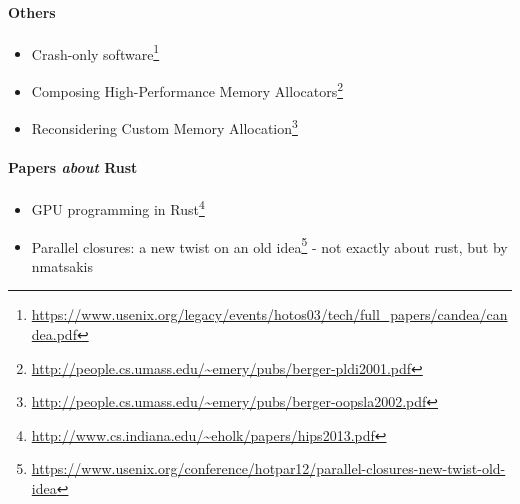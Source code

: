 \documentclass[a4paper,]{book}
\renewcommand{\href}[2]{#2\footnote{\url{#1}}}
\begin{document}
\paragraph{Others}\label{others}

\begin{itemize}
\itemsep1pt\parskip0pt
\item
  \href{https://www.usenix.org/legacy/events/hotos03/tech/full_papers/candea/candea.pdf}{Crash-only
  software}
\item
  \href{http://people.cs.umass.edu/~emery/pubs/berger-pldi2001.pdf}{Composing
  High-Performance Memory Allocators}
\item
  \href{http://people.cs.umass.edu/~emery/pubs/berger-oopsla2002.pdf}{Reconsidering
  Custom Memory Allocation}
\end{itemize}

\paragraph{\texorpdfstring{Papers \emph{about}
Rust}{Papers about Rust}}\label{papers-about-rust}

\begin{itemize}
\itemsep1pt\parskip0pt
\item
  \href{http://www.cs.indiana.edu/~eholk/papers/hips2013.pdf}{GPU
  programming in Rust}
\item
  \href{https://www.usenix.org/conference/hotpar12/parallel-closures-new-twist-old-idea}{Parallel
  closures: a new twist on an old idea} - not exactly about rust, but by
  nmatsakis
\end{itemize}
\end{document}
